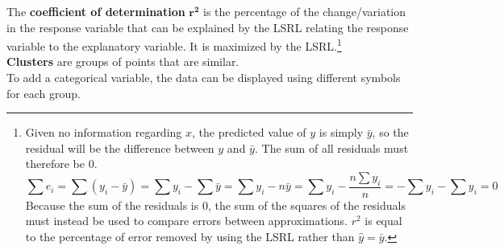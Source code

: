 \documentclass[../AP_Statistics.tex]{subfiles}
\begin{document}
			The \textbf{coefficient of determination} $\bm{r^2}$ is the percentage of the change/variation in the response variable that can be explained by the LSRL relating the response variable to the explanatory variable. It is maximized by the LSRL.\footnote{Given no information regarding $x$, the predicted value of $y$ is simply $\bar{y}$, so the residual will be the difference between $y$ and $\bar{y}$. The sum of all residuals must therefore be 0.\[\sum e_i = \sum(y_i - \bar{y}) = \sum y_i - \sum \bar{y} = \sum y_i - n\bar{y} = \sum y_i - \frac{n\sum 
			y_i}{n} = - \sum y_i - \sum y_i = 0\]Because the sum of the residuals is 0, the sum of the squares of the residuals must instead be used to compare errors between approximations. $r^2$ is equal to the percentage of error removed by using the LSRL rather than $\hat{y} = \bar{y}$.} \\
			\textbf{Clusters}  are groups of points that are similar. \\
			To add a categorical variable, the data can be displayed using different symbols for each group. \\
\end{document}
